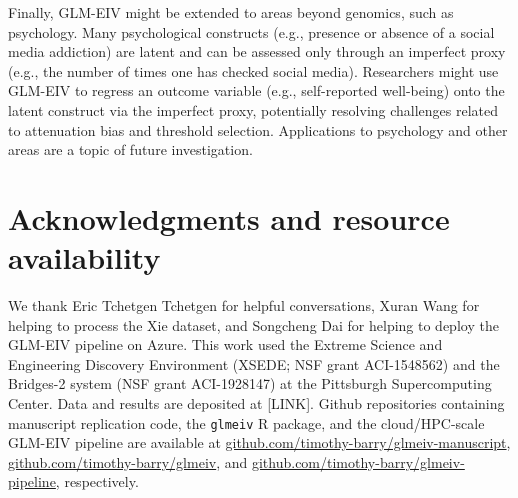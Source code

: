 \documentclass[12pt]{article}
\begin{document}
Finally, GLM-EIV might be extended to areas beyond genomics, such as psychology. Many psychological constructs (e.g., presence or absence of a social media addiction) are latent and can be assessed only through an imperfect proxy (e.g., the number of times one has checked social media). Researchers might use GLM-EIV to regress an outcome variable (e.g., self-reported well-being) onto the latent construct via the imperfect proxy, potentially resolving challenges related to attenuation bias and threshold selection. Applications to psychology and other areas are a topic of future investigation.

\section{Acknowledgments and resource availability}
We thank Eric Tchetgen Tchetgen for helpful conversations, Xuran Wang for helping to process the Xie dataset, and Songcheng Dai for helping to deploy the GLM-EIV pipeline on Azure. This work used the Extreme Science and Engineering Discovery Environment (XSEDE; NSF grant ACI-1548562) and the Bridges-2 system (NSF grant ACI-1928147) at the Pittsburgh Supercomputing Center. Data and results are deposited at [LINK]. Github repositories containing manuscript replication code, the \texttt{glmeiv} R package, and the cloud/HPC-scale GLM-EIV pipeline are available at \url{github.com/timothy-barry/glmeiv-manuscript}, \url{github.com/timothy-barry/glmeiv}, and \url{github.com/timothy-barry/glmeiv-pipeline}, respectively.
\end{document}
